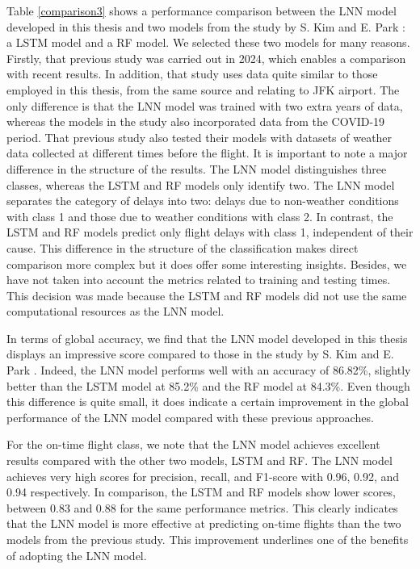 \documentclass[12pt,oneside]{book} %
\begin{document}
\noindent Table \ref{comparison3} shows a performance comparison between the LNN model developed in this thesis and two models from the study by S. Kim and E. Park \cite{kim}: a LSTM model and a RF model. We selected these two models for many reasons. Firstly, that previous study was carried out in 2024, which enables a comparison with recent results. In addition, that study uses data quite similar to those employed in this thesis, from the same source and relating to JFK airport. The only difference is that the LNN model was trained with two extra years of data, whereas the models in the study also incorporated data from the COVID-19 period. That previous study also tested their models with datasets of weather data collected at different times before the flight. It is important to note a major difference in the structure of the results. The LNN model distinguishes three classes, whereas the LSTM and RF models only identify two. The LNN model separates the category of delays into two: delays due to non-weather conditions with class 1 and those due to weather conditions with class 2. In contrast, the LSTM and RF models predict only flight delays with class 1, independent of their cause. This difference in the structure of the classification makes direct comparison more complex but it does offer some interesting insights. Besides, we have not taken into account the metrics related to training and testing times. This decision was made because the LSTM and RF models did not use the same computational resources as the LNN model.

\noindent In terms of global accuracy, we find that the LNN model developed in this thesis displays an impressive score compared to those in the study by S. Kim and E. Park \cite{kim}. Indeed, the LNN model performs well with an accuracy of 86.82\%, slightly better than the LSTM model at 85.2\% and the RF model at 84.3\%. Even though this difference is quite small, it does indicate a certain improvement in the global performance of the LNN model compared with these previous approaches.

\noindent For the on-time flight class, we note that the LNN model achieves excellent results compared with the other two models, LSTM and RF. The LNN model achieves very high scores for precision, recall, and F1-score with 0.96, 0.92, and 0.94 respectively. In comparison, the LSTM and RF models show lower scores, between 0.83 and 0.88 for the same performance metrics. This clearly indicates that the LNN model is more effective at predicting on-time flights than the two models from the previous study. This improvement underlines one of the benefits of adopting the LNN model.
\end{document}
